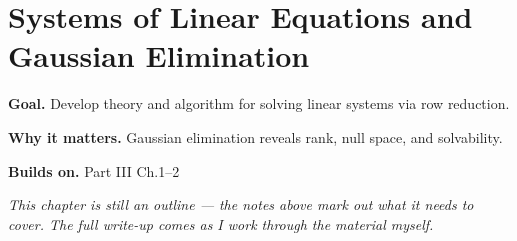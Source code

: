 \chapter{Systems of Linear Equations and Gaussian Elimination}
\label{ch:03-linear-algebra-03}

\begin{chapterintro}
\textbf{Goal.} Develop theory and algorithm for solving linear systems via row reduction.

\textbf{Why it matters.} Gaussian elimination reveals rank, null space, and solvability.

\textbf{Builds on.} Part III Ch.1–2
\end{chapterintro}

\textit{This chapter is still an outline --- the notes above mark out what it needs to cover. The full write-up comes as I work through the material myself.}
